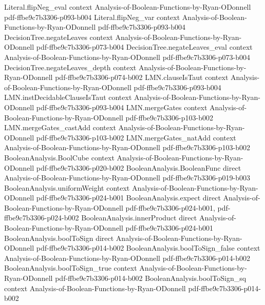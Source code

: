 \begin{lemma}
\proofstep
  {Literal.flipNeg_eval}
  {context}
  {Analysis-of-Boolean-Functions-by-Ryan-ODonnell}
  {pdf-ffbe9c7b3306-p093-b004}
\proofstep
  {Literal.flipNeg_var}
  {context}
  {Analysis-of-Boolean-Functions-by-Ryan-ODonnell}
  {pdf-ffbe9c7b3306-p093-b004}
\proofstep
  {DecisionTree.negateLeaves}
  {context}
  {Analysis-of-Boolean-Functions-by-Ryan-ODonnell}
  {pdf-ffbe9c7b3306-p073-b004}
\proofstep
  {DecisionTree.negateLeaves_eval}
  {context}
  {Analysis-of-Boolean-Functions-by-Ryan-ODonnell}
  {pdf-ffbe9c7b3306-p073-b004}
\proofstep
  {DecisionTree.negateLeaves_depth}
  {context}
  {Analysis-of-Boolean-Functions-by-Ryan-ODonnell}
  {pdf-ffbe9c7b3306-p074-b002}
\proofstep
  {LMN.clauseIsTaut}
  {context}
  {Analysis-of-Boolean-Functions-by-Ryan-ODonnell}
  {pdf-ffbe9c7b3306-p093-b004}
\proofstep
  {LMN.instDecidableClauseIsTaut}
  {context}
  {Analysis-of-Boolean-Functions-by-Ryan-ODonnell}
  {pdf-ffbe9c7b3306-p093-b004}
\proofstep
  {LMN.mergeGates}
  {context}
  {Analysis-of-Boolean-Functions-by-Ryan-ODonnell}
  {pdf-ffbe9c7b3306-p103-b002}
\proofstep
  {LMN.mergeGates_castAdd}
  {context}
  {Analysis-of-Boolean-Functions-by-Ryan-ODonnell}
  {pdf-ffbe9c7b3306-p103-b002}
\proofstep
  {LMN.mergeGates_natAdd}
  {context}
  {Analysis-of-Boolean-Functions-by-Ryan-ODonnell}
  {pdf-ffbe9c7b3306-p103-b002}
\proofstep
  {BooleanAnalysis.BoolCube}
  {context}
  {Analysis-of-Boolean-Functions-by-Ryan-ODonnell}
  {pdf-ffbe9c7b3306-p020-b002}
\proofstep
  {BooleanAnalysis.BooleanFunc}
  {direct}
  {Analysis-of-Boolean-Functions-by-Ryan-ODonnell}
  {pdf-ffbe9c7b3306-p019-b003}
\proofstep
  {BooleanAnalysis.uniformWeight}
  {context}
  {Analysis-of-Boolean-Functions-by-Ryan-ODonnell}
  {pdf-ffbe9c7b3306-p024-b001}
\proofstep
  {BooleanAnalysis.expect}
  {direct}
  {Analysis-of-Boolean-Functions-by-Ryan-ODonnell}
  {pdf-ffbe9c7b3306-p024-b001,
    pdf-ffbe9c7b3306-p024-b002}
\proofstep
  {BooleanAnalysis.innerProduct}
  {direct}
  {Analysis-of-Boolean-Functions-by-Ryan-ODonnell}
  {pdf-ffbe9c7b3306-p024-b001}
\proofstep
  {BooleanAnalysis.boolToSign}
  {direct}
  {Analysis-of-Boolean-Functions-by-Ryan-ODonnell}
  {pdf-ffbe9c7b3306-p014-b002}
\proofstep
  {BooleanAnalysis.boolToSign_false}
  {context}
  {Analysis-of-Boolean-Functions-by-Ryan-ODonnell}
  {pdf-ffbe9c7b3306-p014-b002}
\proofstep
  {BooleanAnalysis.boolToSign_true}
  {context}
  {Analysis-of-Boolean-Functions-by-Ryan-ODonnell}
  {pdf-ffbe9c7b3306-p014-b002}
\proofstep
  {BooleanAnalysis.boolToSign_sq}
  {context}
  {Analysis-of-Boolean-Functions-by-Ryan-ODonnell}
  {pdf-ffbe9c7b3306-p014-b002}
\proofstep

\end{lemma}
